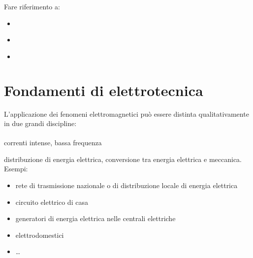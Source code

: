\documentclass[letterpaper,10pt,italian]{jupyterBook}
\begin{document}
\sphinxAtStartPar
Fare riferimento a:
\begin{itemize}
\item {} 
\sphinxAtStartPar
{\hyperref[\detokenize{ch/electromagnetism/electrostatics:physics-hs-electromagnetism-electrostatics-maxwell}]{}}

\item {} 
\sphinxAtStartPar
{\hyperref[\detokenize{ch/electromagnetism/electromagnetism-steady:physics-hs-electromagnetism-electromagnetism-steady-maxwell}]{}}

\item {} 
\sphinxAtStartPar
{\hyperref[\detokenize{ch/electromagnetism/electromagnetism-general:physics-hs-electromagnetism-electromagnetism-general-maxwell}]{}}

\end{itemize}

\sphinxstepscope


\chapter{Fondamenti di elettrotecnica}
\label{\detokenize{ch/electromagnetism/electrical-engineering:fondamenti-di-elettrotecnica}}\label{\detokenize{ch/electromagnetism/electrical-engineering:physics-hs-electromagnetism-electric-engineering}}\label{\detokenize{ch/electromagnetism/electrical-engineering::doc}}
\sphinxAtStartPar
L’applicazione dei fenomeni elettromagnetici può essere distinta qualitativamente in due grandi discipline:
\subsubsection*{}

\sphinxAtStartPar
{} correnti intense, bassa frequenza

\sphinxAtStartPar
{} distribuzione di energia elettrica, conversione tra energia elettrica e meccanica. Esempi:
\begin{itemize}
\item {} 
\sphinxAtStartPar
rete di trasmissione nazionale o di distribuzione locale di energia elettrica

\item {} 
\sphinxAtStartPar
circuito elettrico di casa

\item {} 
\sphinxAtStartPar
generatori di energia elettrica nelle centrali elettriche

\item {} 
\sphinxAtStartPar
elettrodomestici

\item {} 
\sphinxAtStartPar
…

\end{itemize}
\end{document}
